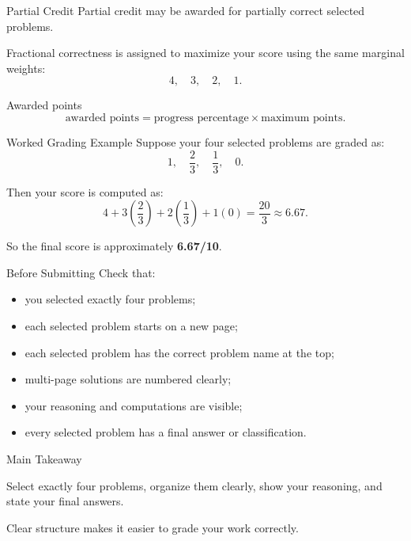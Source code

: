 \documentclass[aspectratio=169]{beamer}
\begin{document}
\begin{frame}{Partial Credit}
  Partial credit may be awarded for partially correct selected problems.

  \vspace{0.4cm}

  Fractional correctness is assigned to maximize your score using the same marginal weights:
  \[
    4,\quad 3,\quad 2,\quad 1.
  \]

  \vspace{0.4cm}

  \begin{block}{Awarded points}
    \[
      \text{awarded points} =
      \text{progress percentage} \times \text{maximum points}.
    \]
  \end{block}
\end{frame}

\begin{frame}{Worked Grading Example}
  Suppose your four selected problems are graded as:
  \[
    1,\quad \frac{2}{3},\quad \frac{1}{3},\quad 0.
  \]

  \vspace{0.3cm}

  Then your score is computed as:
  \[
    4
    + 3\left(\frac{2}{3}\right)
    + 2\left(\frac{1}{3}\right)
    + 1(0)
    = \frac{20}{3}
    \approx 6.67.
  \]

  \vspace{0.3cm}

  So the final score is approximately \textbf{6.67/10}.
\end{frame}

\begin{frame}{Before Submitting}
  Check that:

  \begin{itemize}
    \item you selected exactly four problems;
    \item each selected problem starts on a new page;
    \item each selected problem has the correct problem name at the top;
    \item multi-page solutions are numbered clearly;
    \item your reasoning and computations are visible;
    \item every selected problem has a final answer or classification.
  \end{itemize}
\end{frame}

\begin{frame}{Main Takeaway}
  \begin{center}
    \Large
    Select exactly four problems, organize them clearly, show your reasoning, and state your final answers.
  \end{center}

  \vspace{0.8cm}

  \begin{center}
    \normalsize
    Clear structure makes it easier to grade your work correctly.
  \end{center}
\end{frame}
\end{document}
